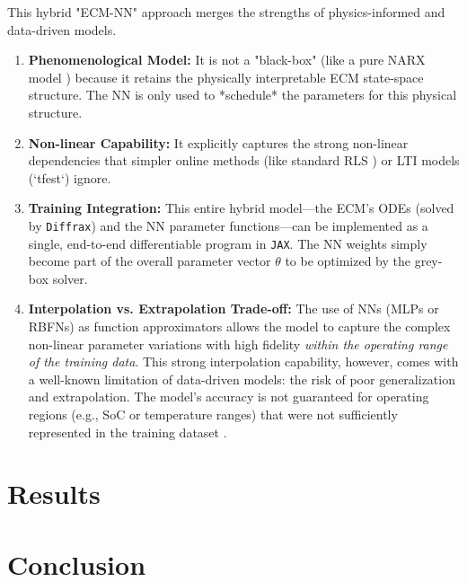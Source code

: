 \documentclass[]{article}
\begin{document}
This hybrid "ECM-NN" approach merges the strengths of physics-informed and data-driven models.
\begin{enumerate}
	\item \textbf{Phenomenological Model:} It is not a "black-box" (like a pure NARX model \cite{takyi2023narx, xia2024hybrid}) because it retains the physically interpretable ECM state-space structure. The NN is only used to *schedule* the parameters for this physical structure.
	
	\item \textbf{Non-linear Capability:} It explicitly captures the strong non-linear dependencies \cite{tran2021comprehensive} that simpler online methods (like standard RLS \cite{pai2023online}) or LTI models (`tfest`) ignore.
	
	\item \textbf{Training Integration:} This entire hybrid model—the ECM's ODEs (solved by \texttt{Diffrax}) and the NN parameter functions—can be implemented as a single, end-to-end differentiable program in \texttt{JAX}. The NN weights simply become part of the overall parameter vector $\theta$ to be optimized by the grey-box solver.
	
	\item \textbf{Interpolation vs. Extrapolation Trade-off:} The use of NNs (MLPs or RBFNs) as function approximators allows the model to capture the complex non-linear parameter variations with high fidelity \textit{within the operating range of the training data}. This strong interpolation capability, however, comes with a well-known limitation of data-driven models: the risk of poor generalization and extrapolation. The model's accuracy is not guaranteed for operating regions (e.g., SoC or temperature ranges) that were not sufficiently represented in the training dataset \cite{valizadeh2024machine, kawahara2023battery}.
\end{enumerate}

\section{Results}

\section{Conclusion}



\end{document}
